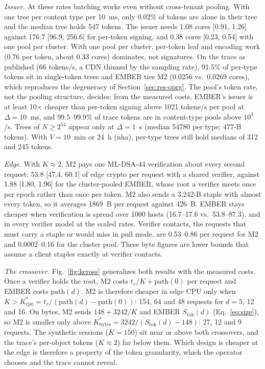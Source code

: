 \emph{Issuer.} At these rates batching works even without cross-tenant pooling. With one tree per content type per 10~ms, only 0.02\% of tokens are alone in their tree and the median tree holds 547 tokens. The issuer needs 1.08 cores [0.91, 1.26] against 176.7 [96.9, 256.6] for per-token signing, and 0.38 cores [0.23, 0.54] with one pool per cluster. With one pool per cluster, per-token leaf and encoding work (0.76\us{} per token, about 0.33 cores) dominates, not signatures. On the trace as published (66 tokens/s, a CDN thinned by the sampling rate), 91.5\% of per-type tokens sit in single-token trees and EMBER ties M2 (0.0256 vs.\ 0.0269 cores), which reproduces the degeneracy of Section~\ref{sec:res-oprg}. The pool's token rate, not the pooling structure, decides: from the measured costs, EMBER's issuer is at least 10$\times$ cheaper than per-token signing above \num{1021} tokens/s per pool at $\Delta=10$~ms, and 99.5--99.9\% of trace tokens are in content-type pools above $10^3$/s. Trees of $N\ge2^{14}$ appear only at $\Delta=1$~s (median \num{54780} per type; 477-B tokens). With $V=10$~min or 24~h (nha), per-type trees still hold medians of 312 and 245 tokens.

\emph{Edge.} With $K\approx2$, M2 pays one ML-DSA-44 verification about every second request: 53.8\us{} [47.4, 60.1] of edge crypto per request with a shared verifier, against 1.88\us{} [1.80, 1.96] for the cluster-pooled EMBER, whose root a verifier meets once per epoch rather than once per token. M2 also sends a 3,242-B staple with almost every token, so it averages \num{1869}~B per request against 426~B. EMBER stays cheaper when verification is spread over 1000 hosts (16.7--17.6 vs.\ 53.8--87.3\us), and in every verifier model at the scaled rates. Verifier contacts, the requests that must carry a staple or would miss in pull mode, are 0.53--0.86 per request for M2 and 0.0002--0.16 for the cluster pool. These byte figures are lower bounds that assume a client staples exactly at verifier contacts.

\emph{The crossover.} Fig.~\ref{fig:kcross} generalizes both results with the measured costs. Once a verifier holds the root, M2 costs $t_v/K+\mathrm{path}(0)$ per request and EMBER costs $\mathrm{path}(d)$. M2 is therefore cheaper in edge CPU only when $K>K^*_{\text{cpu}}=t_v/(\mathrm{path}(d)-\mathrm{path}(0))$: 154, 64 and 48 requests for $d=5$, 12 and 16. On bytes, M2 sends $148+3242/K$ and EMBER $S_{\text{tok}}(d)$ (Eq.~\eqref{eq:size}), so M2 is smaller only above $K^*_{\text{bytes}}=3242/(S_{\text{tok}}(d)-148)$: 27, 12 and 9 requests. The synthetic sessions ($K=150$) sit near or above both crossovers, and the trace's per-object tokens ($K\approx2$) far below them. Which design is cheaper at the edge is therefore a property of the token granularity, which the operator chooses and the trace cannot reveal. 

